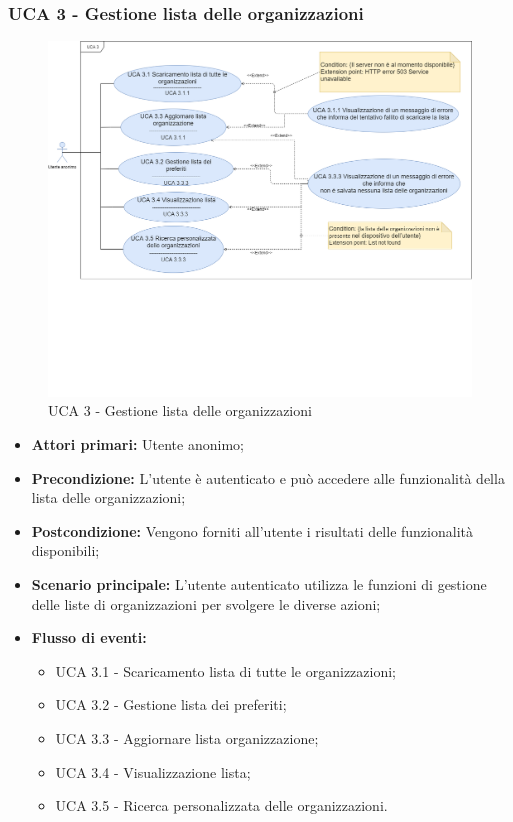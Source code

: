 \newpage

\subsubsection{UCA 3 - Gestione lista delle organizzazioni}%
\begin{figure}[h]
	\centering
	\includegraphics[scale=0.33]{sezioni/UseCase/Immagini/UCA3.png}
	\caption{UCA 3 - Gestione lista delle organizzazioni}
\end{figure}

\begin{itemize}
\item \textbf{Attori primari:} Utente anonimo;
\item \textbf{Precondizione:} L'utente è autenticato e può accedere alle funzionalità della lista delle organizzazioni;
\item \textbf{Postcondizione:} Vengono forniti all'utente i risultati delle funzionalità disponibili;
\item \textbf{Scenario principale:} L'utente autenticato utilizza le funzioni di gestione delle liste di organizzazioni per svolgere le diverse azioni;
\item \textbf{Flusso di eventi:}
	\begin{itemize}
		\item UCA 3.1 - Scaricamento lista di tutte le organizzazioni;
		\item UCA 3.2 - Gestione lista dei preferiti;
		\item UCA 3.3 - Aggiornare lista organizzazione;
		\item UCA 3.4 - Visualizzazione lista;
		\item UCA 3.5 - Ricerca personalizzata delle organizzazioni.
	\end{itemize}
\end{itemize}



